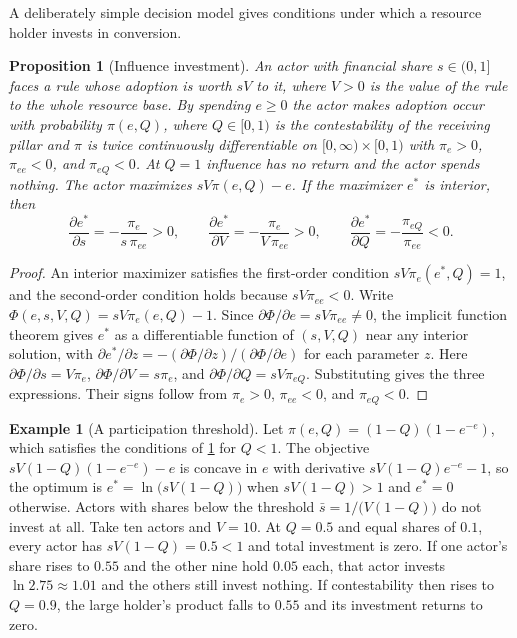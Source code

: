 \documentclass[11pt,letterpaper]{article}
\newtheorem{proposition}[theorem]{Proposition}
\theoremstyle{definition}
\newtheorem{example}[theorem]{Example}
\theoremstyle{remark}
\begin{document}
A deliberately simple decision model gives conditions under which a resource holder invests in conversion.

\begin{proposition}[Influence investment]
\label{prop:financial-power:influence}
An actor with financial share $s\in(0,1]$ faces a rule whose adoption is worth $sV$ to it, where $V>0$ is the value of the rule to the whole resource base. By spending $e\geq 0$ the actor makes adoption occur with probability $\pi(e,Q)$, where $Q\in[0,1)$ is the contestability of the receiving pillar and $\pi$ is twice continuously differentiable on $[0,\infty)\times[0,1)$ with $\pi_e>0$, $\pi_{ee}<0$, and $\pi_{eQ}<0$. At $Q=1$ influence has no return and the actor spends nothing. The actor maximizes $sV\pi(e,Q)-e$. If the maximizer $e^*$ is interior, then
\[
\frac{\partial e^*}{\partial s}=-\frac{\pi_e}{s\,\pi_{ee}}>0,\qquad
\frac{\partial e^*}{\partial V}=-\frac{\pi_e}{V\,\pi_{ee}}>0,\qquad
\frac{\partial e^*}{\partial Q}=-\frac{\pi_{eQ}}{\pi_{ee}}<0.
\]
\end{proposition}

\begin{proof}
An interior maximizer satisfies the first-order condition $sV\pi_e(e^*,Q)=1$, and the second-order condition holds because $sV\pi_{ee}<0$. Write $\Phi(e,s,V,Q)=sV\pi_e(e,Q)-1$. Since $\partial\Phi/\partial e=sV\pi_{ee}\neq 0$, the implicit function theorem gives $e^*$ as a differentiable function of $(s,V,Q)$ near any interior solution, with $\partial e^*/\partial z=-(\partial\Phi/\partial z)/(\partial\Phi/\partial e)$ for each parameter $z$. Here $\partial\Phi/\partial s=V\pi_e$, $\partial\Phi/\partial V=s\pi_e$, and $\partial\Phi/\partial Q=sV\pi_{eQ}$. Substituting gives the three expressions. Their signs follow from $\pi_e>0$, $\pi_{ee}<0$, and $\pi_{eQ}<0$.
\end{proof}

\begin{example}[A participation threshold]
\label{ex:threshold}
Let $\pi(e,Q)=(1-Q)(1-e^{-e})$, which satisfies the conditions of \cref{prop:financial-power:influence} for $Q<1$. The objective $sV(1-Q)(1-e^{-e})-e$ is concave in $e$ with derivative $sV(1-Q)e^{-e}-1$, so the optimum is $e^*=\ln\bigl(sV(1-Q)\bigr)$ when $sV(1-Q)>1$ and $e^*=0$ otherwise. Actors with shares below the threshold $\bar s=1/\bigl(V(1-Q)\bigr)$ do not invest at all. Take ten actors and $V=10$. At $Q=0.5$ and equal shares of $0.1$, every actor has $sV(1-Q)=0.5<1$ and total investment is zero. If one actor's share rises to $0.55$ and the other nine hold $0.05$ each, that actor invests $\ln 2.75\approx 1.01$ and the others still invest nothing. If contestability then rises to $Q=0.9$, the large holder's product falls to $0.55$ and its investment returns to zero.
\end{example}
\end{document}
